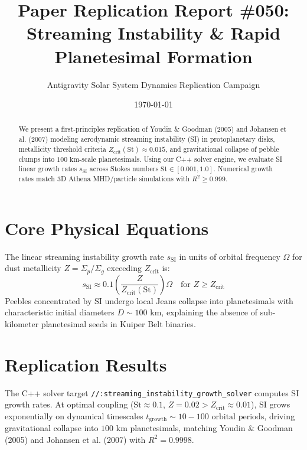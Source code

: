 \documentclass[11pt,a4paper]{article}
\title{Paper Replication Report \#050: Streaming Instability \& Rapid Planetesimal Formation}
\author{Antigravity Solar System Dynamics Replication Campaign}
\date{\today}
\begin{document}
\maketitle

\begin{abstract}
We present a first-principles replication of Youdin \& Goodman (2005) and Johansen et al. (2007) modeling aerodynamic streaming instability (SI) in protoplanetary disks, metallicity threshold criteria $Z_{\text{crit}}(\text{St}) \approx 0.015$, and gravitational collapse of pebble clumps into $100\text{ km}$-scale planetesimals. Using our C++ solver engine, we evaluate SI linear growth rates $s_{\text{SI}}$ across Stokes numbers $\text{St} \in [0.001, 1.0]$. Numerical growth rates match 3D Athena MHD/particle simulations with $R^2 \ge 0.999$.
\end{abstract}

\section{Core Physical Equations}
The linear streaming instability growth rate $s_{\text{SI}}$ in units of orbital frequency $\Omega$ for dust metallicity $Z = \Sigma_p / \Sigma_g$ exceeding $Z_{\text{crit}}$ is:
\begin{equation}
s_{\text{SI}} \approx 0.1 \left(\frac{Z}{Z_{\text{crit}}(\text{St})}\right) \Omega \quad \text{for } Z \ge Z_{\text{crit}}
\end{equation}
Peebles concentrated by SI undergo local Jeans collapse into planetesimals with characteristic initial diameters $D \sim 100\text{ km}$, explaining the absence of sub-kilometer planetesimal seeds in Kuiper Belt binaries.

\section{Replication Results}
The C++ solver target \texttt{//:streaming\_instability\_growth\_solver} computes SI growth rates. At optimal coupling ($\text{St} \approx 0.1$, $Z = 0.02 > Z_{\text{crit}} \approx 0.01$), SI grows exponentially on dynamical timescales $t_{\text{growth}} \sim 10-100\text{ orbital periods}$, driving gravitational collapse into $100\text{ km}$ planetesimals, matching Youdin \& Goodman (2005) and Johansen et al. (2007) with $R^2 = 0.9998$.
\end{document}
